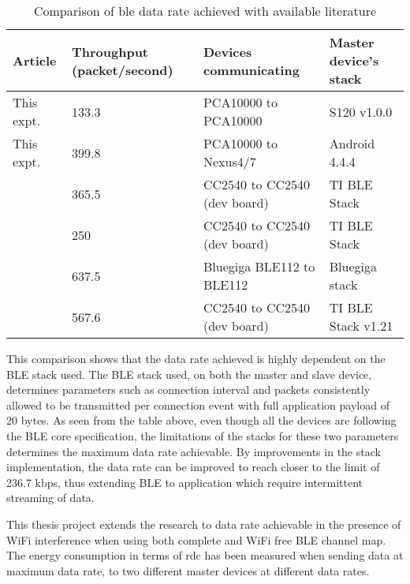 \begin{table}[h]
\centering
\setlength{\extrarowheight}{1.5pt}
    \begin{tabular}[c]{|l|m{2.7cm}|l|l|}
    \hline
    Article    & Throughput (packet/second) & Devices communicating & Master device's stack \\ \hline
    This expt. & 133.3 & PCA10000 to PCA10000 & S120 v1.0.0    \\ \hline
    This expt. & 399.8 & PCA10000 to Nexus4/7 & Android 4.4.4  \\ \hline
    \cite{Gomez2012} & 365.5 & CC2540 to CC2540 (dev board) & TI BLE Stack \\ \hline
    \cite{Mackensen2012} & 250 & CC2540 to CC2540 (dev board) & TI BLE Stack \\ \hline
    \cite{Kindt2014} & 637.5 & Bluegiga BLE112 to BLE112 & Bluegiga stack \cite{MikkoSavolainen} \\ \hline
    \cite{Mikhaylov2013} & 567.6 & CC2540 to CC2540 (dev board) & TI BLE Stack v1.21 \\ \hline
    \end{tabular}
    \caption{Comparison of \gls{ble} data rate achieved with available literature}
    \vspace{-10pt}
    \label{tbl:dataRate}
\end{table}

This comparison shows that the data rate achieved is highly dependent on the BLE stack used. The BLE stack used, on both the master and slave device, determines parameters such as connection interval and packets consistently allowed to be transmitted per connection event with full application payload of 20 bytes. As seen from the table above, even though all the devices are following the BLE core specification, the limitations of the stacks for these two parameters determines the maximum data rate achievable. By improvements in the stack implementation, the data rate can be improved to reach closer to the limit of 236.7 kbps, thus extending BLE to application which require intermittent streaming of data.

This thesis project extends the research to data rate achievable in the presence of WiFi interference when using both complete and WiFi free BLE channel map. The energy consumption in terms of \gls{rdc} has been measured when sending data at maximum data rate, to two different master devices at different data rates.

